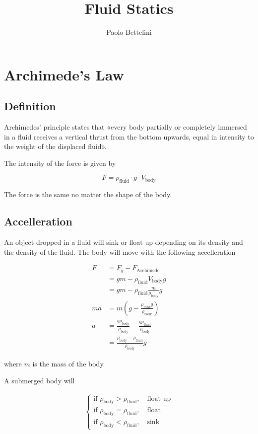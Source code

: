 \documentclass{article}
\title{Fluid Statics}
\author{Paolo Bettelini}
\date{}
\begin{document}
\maketitle
\tableofcontents
\pagebreak

\section{Archimede's Law}

\subsection{Definition}

Archimedes' principle states that
«every body partially or completely immersed in a fluid receives a
vertical thrust from the bottom upwards,
equal in intensity to the weight of the displaced fluid».

The intensity of the force is given by

\[
    F = \rho_\text{fluid} \cdot g \cdot V_\text{body}
\]

The force is the same no matter the shape of the body.

\subsection{Accelleration}

An object dropped in a fluid will sink or float up
depending on its density and the density of the fluid.
The body will move with the following accelleration

\begin{align*}
    F &= F_g - F_\text{Archimede} \\
    &= gm - \rho_\text{fluid}V_\text{body}g \\
    &= gm - \rho_\text{fluid}\frac{m}{\rho_\text{body}}g \\
    ma &= m \left( g- \frac{\rho_\text{fluid}g}{\rho_\text{body}} \right) \\
    a &= \frac{g\rho_\text{body}}{\rho_\text{body}} - \frac{g\rho_\text{fluid}}{\rho_\text{body}} \\
    &= \frac{\rho_\text{body} - \rho_\text{fluid}}{\rho_\text{body}}g
\end{align*}

where \(m\) is the mass of the body.

A submerged body will

\begin{align*}
	\begin{cases}
        \text{if } \rho_\text{body} > \rho_\text{fluid},\quad \text{float up} \\
        \text{if } \rho_\text{body} = \rho_\text{fluid},\quad \text{float} \\
        \text{if } \rho_\text{body} < \rho_\text{fluid},\quad \text{sink}
	\end{cases}
\end{align*}

\pagebreak
\end{document}
